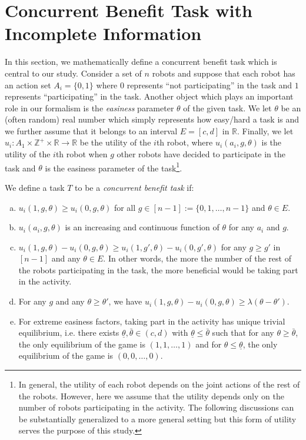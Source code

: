 \documentclass[conference]{IEEEtran}
\def\Z{\mathbb{Z}}
\def\R{\mathbb{R}}
\begin{document}
\section{Concurrent Benefit Task with Incomplete Information}
In this section, we mathematically define a concurrent benefit task which is central to our study. Consider a set of $n$ robots and suppose that each robot has an action set $A_i=\{0,1\}$ where $0$ represents ``not participating'' in the task and $1$ represents ``participating'' in the task.  Another object which plays an important role in our formalism is the \textit{easiness} parameter $\theta$ of the given task. We let $\theta$ be an (often random) real number which simply represents how easy/hard a task is and we further assume that it belongs to an interval $E=[c,d]$ in $\R$.  Finally, we let $u_i:A_1\times\Z^+\times \R\to \R$ be the utility of the $i$th robot, where $u_i(a_i,g,\theta)$ is the utility of the $i$th robot when  $g$ other robots have decided to participate in the task and $\theta$ is the easiness parameter of the task\footnote{In general, the utility of each robot depends on the joint actions of the rest of the robots. However, here we assume that the utility depends only on the number of robots participating in the activity. The following discussions can be substantially generalized to a more general setting but this form of utility serves the purpose of this study.}. 

We define a task $T$ to be a \textit{concurrent benefit task} if: 
\begin{enumerate}[a.]
	\item $u_i(1,g,\theta)\geq u_i(0,g,\theta)$ for all $g\in[n-1]:=\{0,1,\ldots,n-1\}$ and $\theta \in E$. 
	\item $u_i(a_i,g,\theta)$ is an increasing and continuous function of $\theta$ for any $a_i$ and $g$. 
	\item $u_i(1,g,\theta)-u_i(0,g,\theta)\geq u_i(1,g',\theta)-u_i(0,g',\theta)$ for any $g\geq g'$ in $[n-1]$ and any $\theta\in E$. In other words, the more the number of the rest of the robots participating in the task, the more beneficial would be taking part in the activity.
	\item For any $g$ and any $\theta\geq \theta'$, we have $u_i(1,g,\theta)-u_i(0,g,\theta)\geq \lambda (\theta-\theta')$. 
	\item For extreme easiness factors, taking part in the activity has unique trivial equilibrium, i.e. there exists $\underline{\theta},\bar{\theta}\in (c,d)$ with $\underline{\theta}\leq \bar{\theta}$ such that for any $\theta\geq \bar{\theta}$, the only equilibrium of the game is $(1,1,\ldots,1)$ and for $\theta\leq \underline{\theta}$, the only equilibrium of the game is $(0,0,\ldots,0)$.
\end{enumerate}
\end{document}
